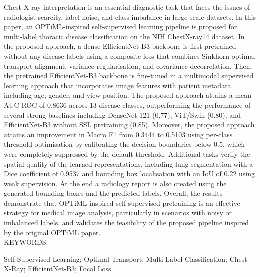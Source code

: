 \documentclass[BTech]{iiitdmdiss}
\begin{document}
\abstract
Chest X-ray interpretation is an essential diagnostic task that faces the issues of radiologist scarcity, label noise, and class imbalance in large-scale datasets. In this paper, an OPTiML-inspired self-supervised learning pipeline is proposed for multi-label thoracic disease classification on the NIH ChestX-ray14 dataset. In the proposed approach, a dense EfficientNet-B3 backbone is first pretrained without any disease labels using a composite loss that combines Sinkhorn optimal transport alignment, variance regularisation, and covariance decorrelation. Then, the pretrained EfficientNet-B3 backbone is fine-tuned in a multimodal supervised learning approach that incorporates image features with patient metadata including age, gender, and view position. The proposed approach attains a mean AUC-ROC of 0.8636 across 13 disease classes, outperforming the performance of several strong baselines including DenseNet-121 (0.77), ViT/Swin (0.80), and EfficientNet-B3 without SSL pretraining (0.85). Moreover, the proposed approach attains an improvement in Macro F1 from 0.3444 to 0.5103 using per-class threshold optimisation by calibrating the decision boundaries below 0.5, which were completely suppressed by the default threshold. Additional tasks verify the spatial quality of the learned representations, including lung segmentation with a Dice coefficient of 0.9537 and bounding box localisation with an IoU of 0.22 using weak supervision. At the end a radiology report is also created using the generated bounding boxes and the predicted labels. Overall, the results demonstrate that OPTiML-inspired self-supervised pretraining is an effective strategy for medical image analysis, particularly in scenarios with noisy or imbalanced labels, and validates the feasibility of the proposed pipeline inspired by the original OPTiML paper.
\\
\vspace{10pt}
\noindent KEYWORDS: \hspace*{0.5em} \parbox[t]{4.4in}{Self-Supervised Learning; Optimal Transport; Multi-Label Classification; Chest X-Ray; EfficientNet-B3; Focal Loss.}


\begin{singlespace}
\tableofcontents
\thispagestyle{empty}

\listoftables
{}
\listoffigures
{}
\end{singlespace}
\end{document}
